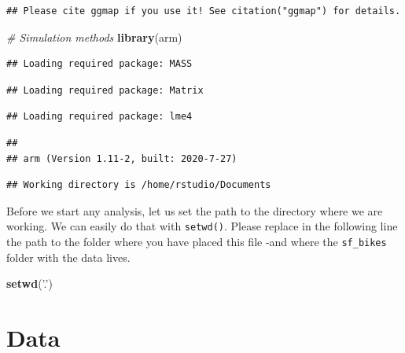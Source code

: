 \documentclass[
]{book}
\newenvironment{Shaded}{\begin{snugshade}}{\end{snugshade}}
\newcommand{\CommentTok}[1]{\textcolor[rgb]{0.56,0.35,0.01}{\textit{#1}}}
\newcommand{\KeywordTok}[1]{\textcolor[rgb]{0.13,0.29,0.53}{\textbf{#1}}}
\newcommand{\NormalTok}[1]{#1}
\newcommand{\StringTok}[1]{\textcolor[rgb]{0.31,0.60,0.02}{#1}}
\begin{document}
\begin{verbatim}
## Please cite ggmap if you use it! See citation("ggmap") for details.
\end{verbatim}

\begin{Shaded}
\begin{Highlighting}[]
\CommentTok{# Simulation methods}
\KeywordTok{library}\NormalTok{(arm)}
\end{Highlighting}
\end{Shaded}

\begin{verbatim}
## Loading required package: MASS
\end{verbatim}

\begin{verbatim}
## Loading required package: Matrix
\end{verbatim}

\begin{verbatim}
## Loading required package: lme4
\end{verbatim}

\begin{verbatim}
## 
## arm (Version 1.11-2, built: 2020-7-27)
\end{verbatim}

\begin{verbatim}
## Working directory is /home/rstudio/Documents
\end{verbatim}

Before we start any analysis, let us set the path to the directory where we are working. We can easily do that with \texttt{setwd()}. Please replace in the following line the path to the folder where you have placed this file -and where the \texttt{sf\_bikes} folder with the data lives.

\begin{Shaded}
\begin{Highlighting}[]
\KeywordTok{setwd}\NormalTok{(}\StringTok{'.'}\NormalTok{)}
\end{Highlighting}
\end{Shaded}

\hypertarget{data-1}{%
\section{Data}\label{data-1}}
\end{document}
